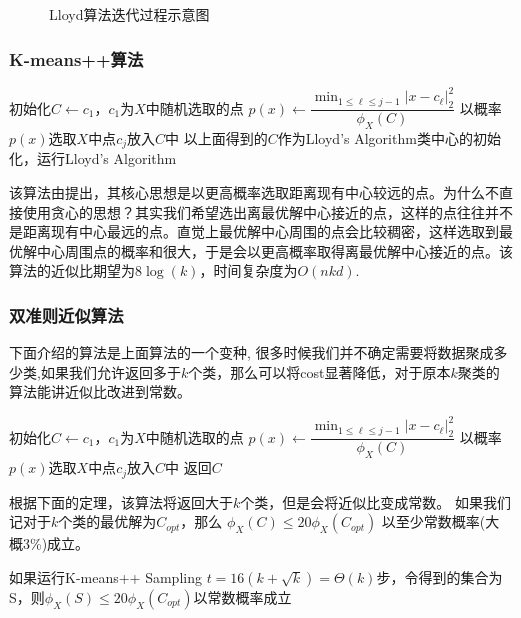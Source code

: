 \documentclass[lang=cn,newtx,10pt,scheme=chinese,chinesefont=nofont,citestyle=gb7714-2015, bibstyle=gb7714-2015]{elegantbook}
\begin{document}
\begin{refsection}
\begin{figure}[htbp]
\caption{Lloyd算法迭代过程示意图}
\end{figure}
\subsubsection{K-means++算法}

\begin{algorithm}[H]
\caption{K-means++ \cite{arthur2006k}}
\begin{algorithmic}
\State 初始化$C \leftarrow {c_1}$，$c_1$为$X$中随机选取的点
\State $p(x) \leftarrow \dfrac{\min_{1 \leq \ell \leq j-1} |x - c_\ell|_2^2}{\phi_X(C)}$
\State 以概率$p(x)$选取$X$中点$c_j$放入$C$中
\EndFor
\State 以上面得到的$C$作为Lloyd's Algorithm类中心的初始化，运行Lloyd's Algorithm
\end{algorithmic}
\end{algorithm}
该算法由\cite{Aggarwal2009Adaptive}提出，其核心思想是以更高概率选取距离现有中心较远的点。为什么不直接使用贪心的思想？其实我们希望选出离最优解中心接近的点，这样的点往往并不是距离现有中心最远的点。直觉上最优解中心周围的点会比较稠密，这样选取到最优解中心周围点的概率和很大，于是会以更高概率取得离最优解中心接近的点。该算法的近似比期望为$8\log(k)$，时间复杂度为$O(nkd)$.

\subsubsection{双准则近似算法}
下面介绍的算法是上面算法的一个变种, 很多时候我们并不确定需要将数据聚成多少类,如果我们允许返回多于$k$个类，那么可以将cost显著降低，对于原本$k$聚类的算法能讲近似比改进到常数。
\begin{algorithm}[H]
\caption{Bicriteria Approximation for K-means}
\begin{algorithmic}
\State 初始化$C \leftarrow {c_1}$，$c_1$为$X$中随机选取的点
\State $p(x) \leftarrow \dfrac{\min_{1 \leq \ell \leq j-1} |x - c_\ell|_2^2}{\phi_X(C)}$
\State 以概率$p(x)$选取$X$中点$c_j$放入$C$中
\EndFor
\State 返回$C$
\end{algorithmic}
\end{algorithm}

根据下面的定理，该算法将返回大于$k$个类，但是会将近似比变成常数。
如果我们记对于$k$个类的最优解为$C_{opt}$，那么
$\phi_X(C)\leq 20\phi_X(C_{opt})$ 以至少常数概率(大概3\%)成立。
\begin{theorem}
如果运行K-means++ Sampling $t = 16(k+\sqrt{k}) = \Theta(k)$步，令得到的集合为S，则$\phi_X(S)\leq 20\phi_X(C_{opt})$以常数概率成立
\end{theorem}

\end{refsection}
\end{document}
